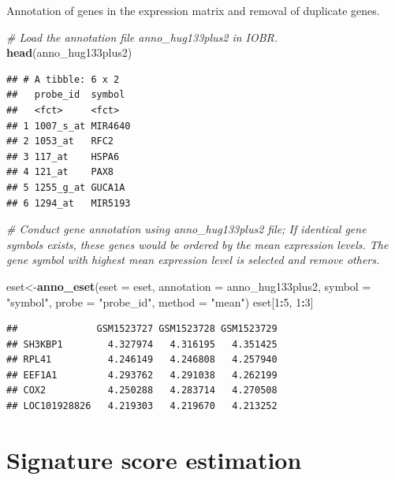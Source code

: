 \documentclass[
  12pt,
]{book}
\newenvironment{Shaded}{\begin{snugshade}}{\end{snugshade}}
\newcommand{\AttributeTok}[1]{\textcolor[rgb]{0.13,0.29,0.53}{#1}}
\newcommand{\CommentTok}[1]{\textcolor[rgb]{0.56,0.35,0.01}{\textit{#1}}}
\newcommand{\DecValTok}[1]{\textcolor[rgb]{0.00,0.00,0.81}{#1}}
\newcommand{\FunctionTok}[1]{\textcolor[rgb]{0.13,0.29,0.53}{\textbf{#1}}}
\newcommand{\NormalTok}[1]{#1}
\newcommand{\OtherTok}[1]{\textcolor[rgb]{0.56,0.35,0.01}{#1}}
\newcommand{\SpecialCharTok}[1]{\textcolor[rgb]{0.81,0.36,0.00}{\textbf{#1}}}
\newcommand{\StringTok}[1]{\textcolor[rgb]{0.31,0.60,0.02}{#1}}
\theoremstyle{definition}
\theoremstyle{definition}
\theoremstyle{definition}
\theoremstyle{definition}
\theoremstyle{remark}
\begin{document}
Annotation of genes in the expression matrix and removal of duplicate genes.

\begin{Shaded}
\begin{Highlighting}[]
\CommentTok{\# Load the annotation file \textasciigrave{}anno\_hug133plus2\textasciigrave{} in IOBR.}
\FunctionTok{head}\NormalTok{(anno\_hug133plus2)}
\end{Highlighting}
\end{Shaded}

\begin{verbatim}
## # A tibble: 6 x 2
##   probe_id  symbol 
##   <fct>     <fct>  
## 1 1007_s_at MIR4640
## 2 1053_at   RFC2   
## 3 117_at    HSPA6  
## 4 121_at    PAX8   
## 5 1255_g_at GUCA1A 
## 6 1294_at   MIR5193
\end{verbatim}

\begin{Shaded}
\begin{Highlighting}[]
\CommentTok{\# Conduct gene annotation using \textasciigrave{}anno\_hug133plus2\textasciigrave{} file; If identical gene symbols exists, these genes would be ordered by the mean expression levels. The gene symbol with highest mean expression level is selected and remove others. }

\NormalTok{eset}\OtherTok{\textless{}{-}}\FunctionTok{anno\_eset}\NormalTok{(}\AttributeTok{eset       =}\NormalTok{ eset,}
                \AttributeTok{annotation =}\NormalTok{ anno\_hug133plus2,}
                \AttributeTok{symbol     =} \StringTok{"symbol"}\NormalTok{,}
                \AttributeTok{probe      =} \StringTok{"probe\_id"}\NormalTok{,}
                \AttributeTok{method     =} \StringTok{"mean"}\NormalTok{)}
\NormalTok{eset[}\DecValTok{1}\SpecialCharTok{:}\DecValTok{5}\NormalTok{, }\DecValTok{1}\SpecialCharTok{:}\DecValTok{3}\NormalTok{]}
\end{Highlighting}
\end{Shaded}

\begin{verbatim}
##              GSM1523727 GSM1523728 GSM1523729
## SH3KBP1        4.327974   4.316195   4.351425
## RPL41          4.246149   4.246808   4.257940
## EEF1A1         4.293762   4.291038   4.262199
## COX2           4.250288   4.283714   4.270508
## LOC101928826   4.219303   4.219670   4.213252
\end{verbatim}

\hypertarget{signature-score-estimation}{%
\section{Signature score estimation}\label{signature-score-estimation}}
\end{document}
